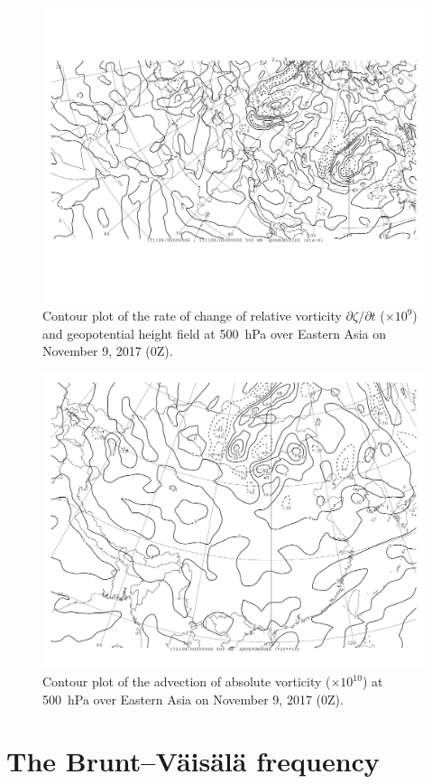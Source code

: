 \documentclass[11pt]{article}
\begin{document}
\begin{figure}[h!]
	\centering
	\includegraphics[width=\textwidth]{dvordt_500hPa_China}
	\caption{Contour plot of the rate of change of relative vorticity $\partial\zeta/\partial t$ ($\times 10^9$) and geopotential height field at \SI{500}{\hecto\Pa} over Eastern Asia on November 9, 2017 (0Z).}
	\label{fig:dvordt_500hPa_China}
\end{figure}

\begin{figure}[h!]
	\centering
	\includegraphics[width=\textwidth]{adv_avor_uobs_500hPa_China}
	\caption{Contour plot of the advection of absolute vorticity ($\times 10^{10}$) at \SI{500}{\hecto\Pa} over Eastern Asia on November 9, 2017 (0Z).}
	\label{fig:adv_avor_uobs_500hPa_China}
\end{figure}

\section{The Brunt--Väisälä frequency}
\end{document}
